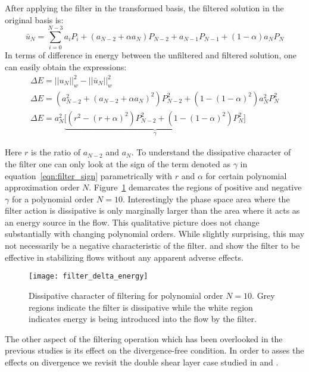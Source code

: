 After applying the filter in the transformed basis, the filtered solution in the original basis is: 
\begin{equation}
\bar{u}_{N} = \sum_{i=0}^{N-3}a_{i}P_{i} + (a_{N-2} + \alpha a_{N})P_{N-2} + a_{N-1}P_{N-1} + (1-\alpha)a_{N}P_{N}
\end{equation}
In terms of difference in energy between the unfiltered and filtered solution, one can easily obtain the expressions:
\begin{gather}
\Delta E = ||u_{N}||_{w}^{2} - ||\bar{u}_{N}||_{w}^{2} \\
\Delta E = (a_{N-2}^{2} + (a_{N-2} +\alpha a_{N})^{2})P_{N-2}^{2} + (1 - (1-\alpha)^{2})a_{N}^{2}P_{N}^{2} \nonumber\\
\Delta E = a_{N}^2\underbrace{\big[(r^{2} - (r+ \alpha)^{2})P_{N-2}^{2} + (1 - (1-\alpha)^{2})P_{N}^{2}     \big]}_{\gamma} \label{eqn:filter_sign}
\end{gather}

Here $r$ is the ratio of $a_{N-2}$ and $a_{N}$. To understand the dissipative character of the filter one can only look at the sign of the term denoted as $\gamma$ in equation~\ref{eqn:filter_sign} parametrically with $r$ and $\alpha$ for certain polynomial approximation order $N$. Figure~\ref{fig:filter_dissipation} demarcates the regions of positive and negative $\gamma$ for a polynomial order $N=10$. Interestingly the phase space area where the filter action is dissipative is only marginally larger than the area where it acts as an energy source in the flow. This qualitative picture does not change substantially with changing polynomial orders. While slightly surprising, this may not necessarily be a negative characteristic of the filter. \cite{fischer01} and \cite{malm13} show the filter to be effective in stabilizing flows without any apparent adverse effects.

\begin{figure}[h]
\centerline{\texttt{[image: filter\_delta\_energy]}}
\caption{\small{Dissipative character of filtering for polynomial order $N=10$. Grey regions indicate the filter is dissipative while the white region indicates energy is being introduced into the flow by the filter.}}
\label{fig:filter_dissipation}
\end{figure}

The other aspect of the filtering operation which has been overlooked in the previous studies is its effect on the divergence-free condition. In order to asses the effects on divergence we revisit the double shear layer case studied in \cite{fischer01} and \cite{malm13}.

